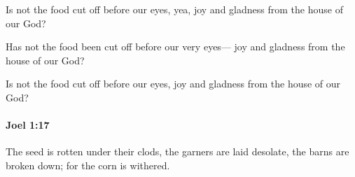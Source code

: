 			\begin{versebox}
					\item[BHS] 
					\item[LXX] 
					\item[ASV] Is not the food cut off before our eyes, yea, joy and gladness from the house of our God?
					\item[NIV] Has not the food been cut off before our very eyes— joy and gladness from the house of our God?
					\item[NRSV] Is not the food cut off before our eyes, joy and gladness from the house of our God?
			\end{versebox}

		\paragraph{Joel 1:17} %
			\label{JOEL-1-17}

			The seed is rotten under their clods, the garners are laid desolate, the barns are broken down; for the corn is withered.

